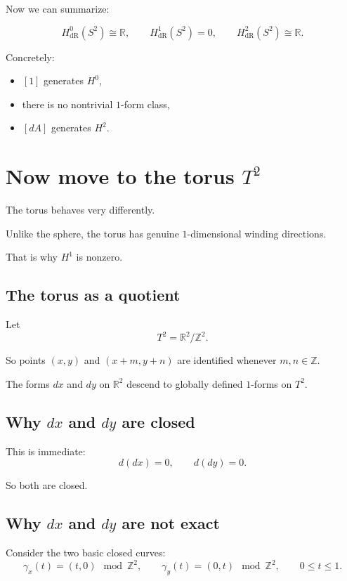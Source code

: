 \documentclass[11pt]{article}
\begin{document}
	Now we can summarize:
	
	\[
	H^0_{\mathrm{dR}}(S^2)\cong \mathbb{R},
	\qquad
	H^1_{\mathrm{dR}}(S^2)=0,
	\qquad
	H^2_{\mathrm{dR}}(S^2)\cong \mathbb{R}.
	\]
	
	Concretely:
	\begin{itemize}[leftmargin=2em]
		\item \([1]\) generates \(H^0\),
		\item there is no nontrivial \(1\)-form class,
		\item \([dA]\) generates \(H^2\).
	\end{itemize}
	
	\section{Now move to the torus \(T^2\)}
	
	The torus behaves very differently.
	
	Unlike the sphere, the torus has genuine \(1\)-dimensional winding directions.
	
	That is why \(H^1\) is nonzero.
	
	\subsection{The torus as a quotient}
	
	Let
	\[
	T^2=\mathbb{R}^2/\mathbb{Z}^2.
	\]
	
	So points \((x,y)\) and \((x+m,y+n)\) are identified whenever \(m,n\in\mathbb{Z}\).
	
	The forms \(dx\) and \(dy\) on \(\mathbb{R}^2\) descend to globally defined \(1\)-forms on \(T^2\).
	
	\subsection{Why \(dx\) and \(dy\) are closed}
	
	This is immediate:
	\[
	d(dx)=0,\qquad d(dy)=0.
	\]
	
	So both are closed.
	
	\subsection{Why \(dx\) and \(dy\) are not exact}
	
	Consider the two basic closed curves:
	\[
	\gamma_x(t)=(t,0)\mod \mathbb{Z}^2,
	\qquad
	\gamma_y(t)=(0,t)\mod \mathbb{Z}^2,
	\qquad 0\le t\le 1.
	\]
	
\end{document}
